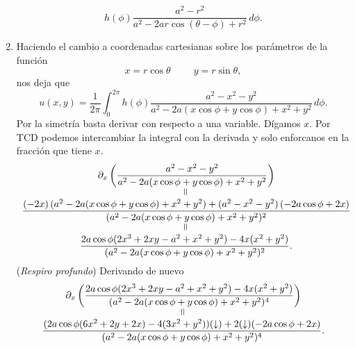 \begin{Solucion}
\begin{enumerate}[label=(\alph*), topsep=3pt, itemsep=2pt]
\begin{displaymath}
			h(\phi)
			\frac
			{a^2 - r^2}
			{a^2 - 2 a r \cos(\theta-\phi)+ r^2}
		\, d\phi.
	\end{displaymath}
	\item
	Haciendo el cambio a coordenadas cartesianas sobre los parámetros
	de la función
	\begin{displaymath}
		x = r\cos\theta \hspace{1cm} y = r\sin\theta,
	\end{displaymath}
	nos deja que
	\begin{displaymath}
		u(x,y)
		=
		\frac{1}{2\pi}
		\int_{0}^{2\pi}
			h(\phi)
			\frac
			{a^2 - x^2 - y^2}
			{a^2 - 2 a (x\cos\phi + y\cos\phi)+ x^2 + y^2}
		\, d\phi.
	\end{displaymath}
	Por la simetría basta derivar con respecto a una variable. Dígamos
	\(x\). Por TCD podemos intercambiar la integral con la derivada y
	solo enforcanos en la fracción que tiene \(x\).
	\begin{displaymath}
		\begin{array}{*1{>{\displaystyle}c}p{5cm}}
		\partial_{x}
		\left(
		\frac
			{a^2 - x^2 - y^2}
			{a^2 - 2 a (x\cos\phi + y\cos\phi)+ x^2 + y^2}
		\right)
		\\\rotatebox{90}{=}\\
		\frac
			{(-2x)\,(a^2 - 2a(x\cos\phi + y\cos\phi) + x^2 + y^2) +
			(a^2 - x^2 - y^2)\,(-2a\cos\phi + 2x)}
			{(a^2 - 2 a (x\cos\phi + y\cos\phi)+ x^2 + y^2)^2}
		\\\rotatebox{90}{=}\\
		\frac
			{2a\cos\phi(2x^3 + 2xy - a^2 + x^2 + y^2) - 4x(x^2+y^2)}
			{(a^2 - 2 a (x\cos\phi + y\cos\phi)+ x^2 + y^2)^2}.
	\end{array}
	\end{displaymath}
	(\textit{Respiro profundo}) Derivando de nuevo
	\begin{displaymath}
		\begin{array}{*1{>{\displaystyle}c}p{5cm}}
		\partial_{x}
		\left(
		\frac
			{2a\cos\phi(2x^3 + 2xy - a^2 + x^2 + y^2) - 4x(x^2+y^2)}
			{(a^2 - 2 a (x\cos\phi + y\cos\phi)+ x^2 + y^2)^4}
		\right)
		\\\rotatebox{90}{=}\\
		\frac
			{(2a\cos\phi(6x^2 + 2y + 2x)-4(3x^2+y^2))(\downarrow) 
			+ 2(\downarrow)(-2a\cos\phi + 2x) }
			{(a^2 - 2 a (x\cos\phi + y\cos\phi)+ x^2 + y^2)^4}.
	\end{array}
	\end{displaymath}
\end{enumerate}
\end{Solucion}

